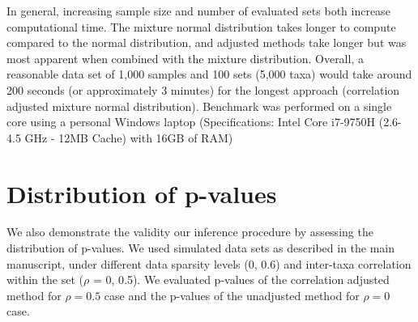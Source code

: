 \documentclass{article}
\begin{document}
In general, increasing sample size and number of evaluated sets both increase computational time. The mixture normal distribution takes longer to compute compared to the normal distribution, and adjusted methods take longer but was most apparent when combined with the mixture distribution. Overall, a reasonable data set of 1,000 samples and 100 sets (5,000 taxa) would take around 200 seconds (or approximately 3 minutes) for the longest approach (correlation adjusted mixture normal distribution). Benchmark was performed on a single core using a personal Windows laptop (Specifications: Intel Core i7-9750H (2.6-4.5 GHz - 12MB Cache) with 16GB of RAM)

\section{Distribution of p-values}
We also demonstrate the validity our inference procedure by assessing the distribution of p-values. We used simulated data sets as described in the main manuscript, under different data sparsity levels (0, 0.6) and inter-taxa correlation within the set ($\rho$ = 0, 0.5). We evaluated p-values of the correlation adjusted method for $\rho = 0.5$ case and the p-values of the unadjusted method for $\rho = 0$ case.  


\newpage
{}

\end{document}

